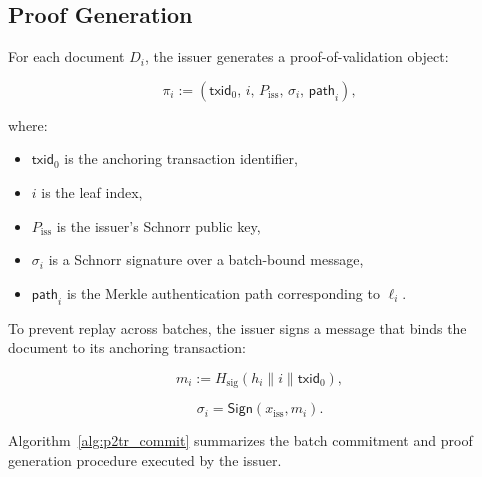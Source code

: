 \documentclass{IEEEoj}
\begin{document}
\subsection{Proof Generation}
\label{sec:proof_generation}

For each document $D_i$, the issuer generates a proof-of-validation object:

\begin{equation}
\pi_i := (\mathsf{txid}_0,\, i,\, P_{\mathrm{iss}},\, \sigma_i,\, \mathsf{path}_i),
\label{eq:proof}
\end{equation}

where:
\begin{itemize}
    \item $\mathsf{txid}_0$ is the anchoring transaction identifier,
    \item $i$ is the leaf index,
    \item $P_{\mathrm{iss}}$ is the issuer’s Schnorr public key,
    \item $\sigma_i$ is a Schnorr signature over a batch-bound message,
    \item $\mathsf{path}_i$ is the Merkle authentication path corresponding to $\ell_i$.
\end{itemize}

To prevent replay across batches, the issuer signs a message that binds the document to its anchoring transaction:

\begin{equation}
m_i := H_{\mathrm{sig}}(h_i \parallel i \parallel \mathsf{txid}_0),
\label{eq:signed_message}
\end{equation}

\begin{equation}
\sigma_i = \textsf{Sign}(x_{\mathrm{iss}}, m_i).
\label{eq:schnorr_signature}
\end{equation}

Algorithm~\ref{alg:p2tr_commit} summarizes the batch commitment and proof generation procedure executed by the issuer.
\end{document}
